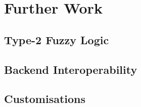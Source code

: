 \section{Further Work}

\subsection{Type-2 Fuzzy Logic}
\label{sec:type2}


\subsection{Backend Interoperability}

\subsection{Customisations}

